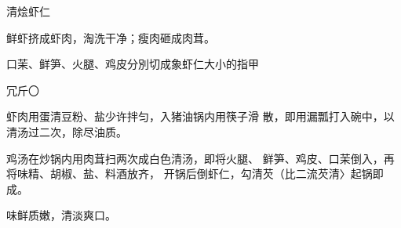 \begin{recipe}{清烩虾仁}

\ingredients




\cooking

\step 	鲜虾挤成虾肉，淘洗干净；瘦肉砸成肉茸。

\step 	口茉、鲜笋、火腿、鸡皮分別切成象虾仁大小的指甲

冗斤〇

\step 	虾肉用蛋清豆粉、盐少许拌匀，入猪油锅内用筷子滑 散，即用漏瓢打入碗中，以清汤过二次，除尽油质。

\step 鸡汤在炒锅内用肉茸扫两次成白色清汤，即将火腿、 鲜笋、鸡皮、口茉倒入，再将味精、胡椒、盐、料酒放齐， 开锅后倒虾仁，勾清芡（比二流芡清〉起锅即成。

\notes

味鲜质嫩，清淡爽口。

\end{recipe}

